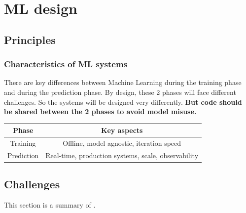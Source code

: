 \documentclass[../main.tex]{subfiles}
\begin{document}
\chapter{ML design}

\section{Principles}
\subsection{Characteristics of ML systems}
There are key differences between Machine Learning during the training phase and during the prediction phase.
By design, these 2 phases will face different challenges. So the systems will be designed very differently.
\textbf{But code should be shared between the 2 phases to avoid model misuse.}
\begin{center}
    \begin{tabular}{ |c|c|}
        \hline
        Phase & Key aspects \\
        \hline
        Training & Offline, model agnostic, iteration speed \\
        \hline
        Prediction & Real-time, production systems, scale, observability \\
        \hline
    \end{tabular}

\end{center}

\section{Challenges}
This section is a summary of \cite{tech-debt}.
\end{document}
